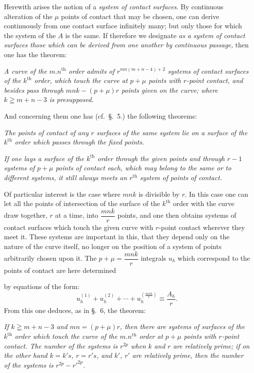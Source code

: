 \documentclass{article}
\begin{document}
Herewith arises the notion of a \emph{system of contact surfaces}. By continuous alteration of the $\mu$ points of contact that may be chosen, one can derive continuously from one contact surface infinitely many; but only those for which the system of the $A$ is the same. If therefore we designate \emph{as a system of contact surfaces those which can be derived from one another by continuous passage,} then one has the theorem:

\emph{A curve of the $m.n^{\text{th}}$ order admits of $r^{mn(m+n-4)+2}$ systems of contact surfaces of the $k^{\text{th}}$ order, which touch the curve at $p+\mu$ points with $r$-point contact, and besides pass through $mnk-(p+\mu)r$ points given on the curve; where $k\geqq m+n-3$ is presupposed.}

And concerning them one has (cf.\ §.~5.) the following theorems:

\emph{The points of contact of any $r$ surfaces of the same system lie on a surface of the $k^{\text{th}}$ order which passes through the fixed points.}

\emph{If one lays a surface of the $k^{\text{th}}$ order through the given points and through $r-1$ systems of $p+\mu$ points of contact each, which may belong to the same or to different systems, it still always meets an $r^{\text{th}}$ system of points of contact.}

Of particular interest is the case where $mnk$ is divisible by $r$. In this case one can let all the points of intersection of the surface of the $k^{\text{th}}$ order with the curve draw together, $r$ at a time, into $\dfrac{mnk}{r}$ points, and one then obtains systems of contact surfaces which touch the given curve with $r$-point contact wherever they meet it. These systems are important in this, that they depend only on the nature of the curve itself, no longer on the position of a system of points arbitrarily chosen upon it. The $p+\mu = \dfrac{mnk}{r}$ integrals $u_{h}$ which correspond to the points of contact are here determined

by equations of the form:
\[
u_{h}^{(1)}+u_{h}^{(2)}+\cdots+u_{h}^{\left(\frac{mnk}{r}\right)} \equiv \frac{A_{h}}{r}.
\]
From this one deduces, as in §.~6, the theorem:

\emph{If $k\geqq m+n-3$ and $mn = (p+\mu)r$, then there are systems of surfaces of the $k^{\text{th}}$ order which touch the curve of the $m.n^{\text{th}}$ order at $p+\mu$ points with $r$-point contact. The number of the systems is $r^{2p}$ when $k$ and $r$ are relatively prime; if on the other hand $k=k's$, $r=r's$, and $k'$, $r'$ are relatively prime, then the number of the systems is $r^{2p}-r'^{2p}$.}
\end{document}
